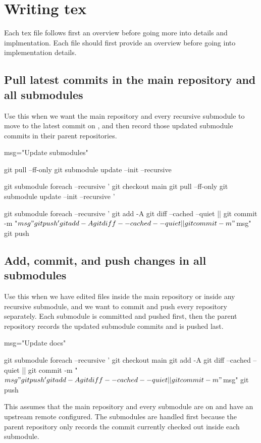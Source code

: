 {\section*{Writing tex}
Each tex file follows first an overview before going more into details and implmentation.
Each  file should first provide an overview before going into implementation details.

\subsection*{Pull latest commits in the main repository and all submodules}
Use this when we want the main repository and every recursive submodule to move to the latest commit on , and then record those updated submodule commits in their parent repositories.
\begin{DocCode}
msg="Update submodules"

git pull --ff-only
git submodule update --init --recursive

git submodule foreach --recursive '
git checkout main
git pull --ff-only
git submodule update --init --recursive
'

git submodule foreach --recursive '
git add -A
git diff --cached --quiet || git commit -m "$msg"
git push
'

git add -A
git diff --cached --quiet || git commit -m "$msg"
git push
\end{DocCode}

\subsection*{Add, commit, and push changes in all submodules}
Use this when we have edited files inside the main repository or inside any recursive
submodule, and we want to commit and push every repository separately.
Each submodule is committed and pushed first, then the parent repository records the updated
submodule commits and is pushed last.
\begin{DocCode}
msg="Update docs"

git submodule foreach --recursive '
git checkout main
git add -A
git diff --cached --quiet || git commit -m "$msg"
git push
'

git add -A
git diff --cached --quiet || git commit -m "$msg"
git push
\end{DocCode}

This assumes that the main repository and every submodule are on  and have an upstream remote configured.
The submodules are handled first because the parent repository only records the commit currently checked out inside each submodule.

}
